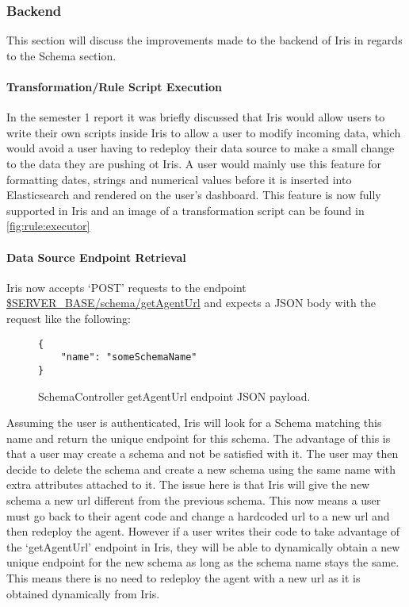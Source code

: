 \documentclass[12pt,a4paper,titlepage]{report}
\begin{document}
\subsubsection{Backend}
This section will discuss the improvements made to the backend of Iris in regards to the Schema section.

\paragraph{Transformation/Rule Script Execution}
\label{para:rule:executor:backend}
In the semester 1 report it was briefly discussed that Iris would allow users to write their own scripts inside Iris to allow a user to modify incoming data, which would avoid a user having to redeploy their data source to make a small change to the data they are pushing ot Iris. A user would mainly use this feature for formatting dates, strings and numerical values before it is inserted into Elasticsearch and rendered on the user's dashboard. This feature is now fully supported in Iris and an image of a transformation script can be found in \cref{fig:rule:executor}

\paragraph{Data Source Endpoint Retrieval}
Iris now accepts `POST' requests to the endpoint \url{$SERVER_BASE/schema/getAgentUrl} and expects a JSON body with the request like the following:

\begin{figure}[H]
\begin{tcolorbox}
\begin{verbatim}
{
    "name": "someSchemaName"
}
\end{verbatim}
\end{tcolorbox}
\caption{SchemaController getAgentUrl endpoint JSON payload.}
\end{figure}
Assuming the user is authenticated, Iris will look for a Schema matching this name and return the unique endpoint for this schema. The advantage of this is that a user may create a schema and not be satisfied with it. The user may then decide to delete the schema and create a new schema using the same name with extra attributes attached to it. The issue here is that Iris will give the new schema a new url different from the previous schema. This now means a user must go back to their agent code and change a hardcoded url to a new url and then redeploy the agent. However if a user writes their code to take advantage of the `getAgentUrl' endpoint in Iris, they will be able to dynamically obtain a new unique endpoint for the new schema as long as the schema name stays the same. This means there is no need to redeploy the agent with a new url as it is obtained dynamically from Iris.
\end{document}

